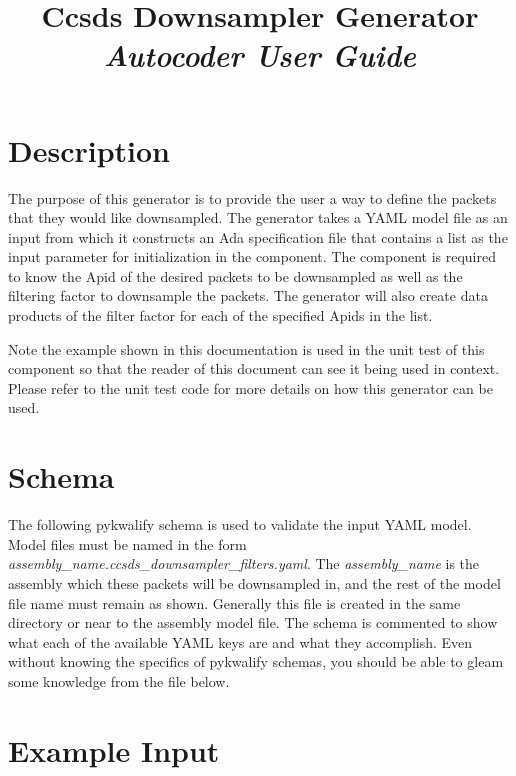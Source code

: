 



\title{\textbf{Ccsds Downsampler Generator} \\
\large\textit{Autocoder User Guide}}
\date{}
\maketitle

\section{Description}

The purpose of this generator is to provide the user a way to define the packets that they would like downsampled. The generator takes a YAML model file as an input from which it constructs an Ada specification file that contains a list as the input parameter for initialization in the component. The component is required to know the Apid of the desired packets to be downsampled as well as the filtering factor to downsample the packets. The generator will also create data products of the filter factor for each of the specified Apids in the list.

Note the example shown in this documentation is used in the unit test of this component so that the reader of this document can see it being used in context. Please refer to the unit test code for more details on how this generator can be used.

\section{Schema}

The following pykwalify schema is used to validate the input YAML model. Model files must be named in the form \textit{assembly\_name.ccsds\_downsampler\_filters.yaml}. The \textit{assembly\_name} is the assembly which these packets will be downsampled in, and the rest of the model file name must remain as shown. Generally this file is created in the same directory or near to the assembly model file. The schema is commented to show what each of the available YAML keys are and what they accomplish. Even without knowing the specifics of pykwalify schemas, you should be able to gleam some knowledge from the file below.


\section{Example Input}

